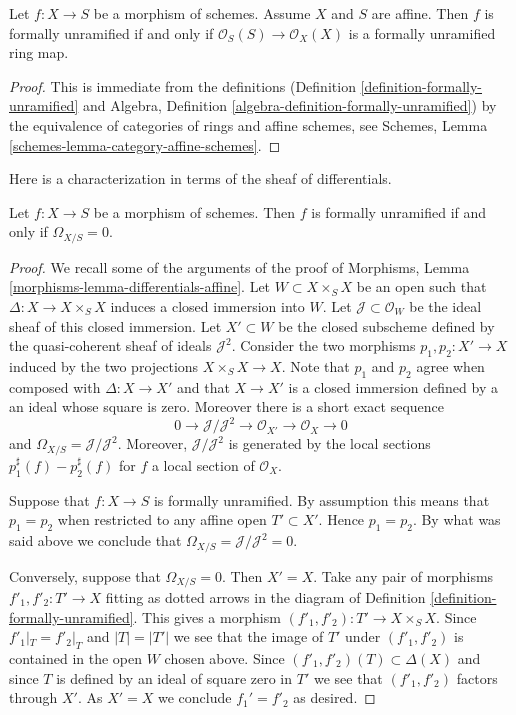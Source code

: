 \begin{lemma}
\label{lemma-affine-formally-unramified}
Let $f : X \to S$ be a morphism of schemes.
Assume $X$ and $S$ are affine.
Then $f$ is formally unramified if and only if
$\mathcal{O}_S(S) \to \mathcal{O}_X(X)$ is a formally unramified
ring map.
\end{lemma}

\begin{proof}
This is immediate from the definitions
(Definition \ref{definition-formally-unramified} and
Algebra, Definition \ref{algebra-definition-formally-unramified})
by the equivalence of categories of rings and affine schemes,
see
Schemes, Lemma \ref{schemes-lemma-category-affine-schemes}.
\end{proof}

\noindent
Here is a characterization in terms of the sheaf of differentials.

\begin{lemma}
\label{lemma-formally-unramified-differentials}
Let $f : X \to S$ be a morphism of schemes.
Then $f$ is formally unramified if and only if $\Omega_{X/S} = 0$.
\end{lemma}

\begin{proof}
We recall some of the arguments of the proof of
Morphisms, Lemma \ref{morphisms-lemma-differentials-affine}.
Let $W \subset X \times_S X$ be an open such that
$\Delta : X \to X \times_S X$ induces a closed immersion into $W$.
Let $\mathcal{J} \subset \mathcal{O}_W$ be the ideal sheaf of this
closed immersion. Let $X' \subset W$ be the closed subscheme
defined by the quasi-coherent sheaf of ideals $\mathcal{J}^2$.
Consider the two morphisms $p_1, p_2 : X' \to X$ induced by
the two projections $X \times_S X \to X$.
Note that $p_1$ and $p_2$ agree when composed with $\Delta : X \to X'$
and that $X \to X'$ is a closed immersion defined by a an ideal
whose square is zero. Moreover there is a short exact sequence
$$
0 \to \mathcal{J}/\mathcal{J}^2 \to \mathcal{O}_{X'} \to \mathcal{O}_X \to 0
$$
and $\Omega_{X/S} = \mathcal{J}/\mathcal{J}^2$. Moreover,
$\mathcal{J}/\mathcal{J}^2$ is generated by the local
sections $p_1^\sharp(f) - p_2^\sharp(f)$ for $f$ a local section of
$\mathcal{O}_X$.

\medskip\noindent
Suppose that $f : X \to S$ is formally unramified.
By assumption this means that $p_1 = p_2$ when restricted to any
affine open $T' \subset X'$. Hence $p_1 = p_2$. By what was said above
we conclude that $\Omega_{X/S} = \mathcal{J}/\mathcal{J}^2 = 0$.

\medskip\noindent
Conversely, suppose that $\Omega_{X/S} = 0$. Then $X' = X$. Take any pair
of morphisms $f'_1, f'_2 : T' \to X$ fitting as dotted arrows in
the diagram of
Definition \ref{definition-formally-unramified}.
This gives a morphism $(f'_1, f'_2) : T' \to X \times_S X$.
Since $f'_1|_T = f'_2|_T$ and $|T| =|T'|$ we see that the image of $T'$
under $(f'_1, f'_2)$ is contained in the open $W$ chosen above. Since
$(f'_1, f'_2)(T) \subset \Delta(X)$ and since $T$ is defined by an ideal
of square zero in $T'$ we see that $(f'_1, f'_2)$ factors through $X'$.
As $X' = X$ we conclude $f_1' = f'_2$ as desired.
\end{proof}

